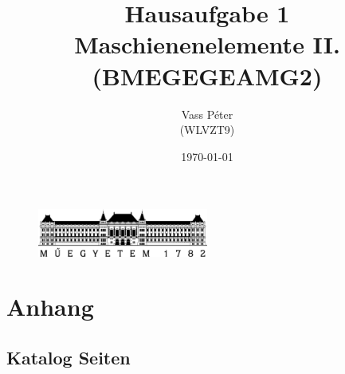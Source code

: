 

\title{Hausaufgabe 1 \\ \small{Maschienenelemente II. (BMEGEGEAMG2)}}
\author{Vass Péter \\ \small{(WLVZT9)}}
\date{\today}



%
\maketitle %

\begin{figure}[b]
  \centering
  \includegraphics[width=0.5\textwidth]{bme1782.pdf}
\end{figure}

\clearpage

%
%
\tableofcontents
\clearpage
%
%



\pagebreak

\section{Anhang}

\subsection{Katalog Seiten}































